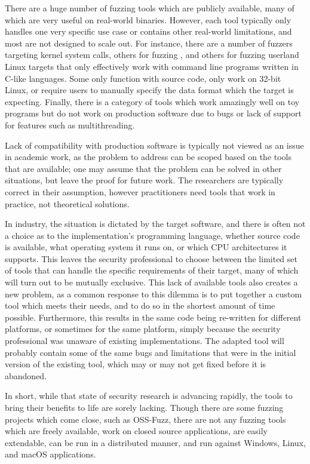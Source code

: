 There are a huge number of fuzzing tools\cite{afl,aflosx,winafl,peach22,syzkaller,ossfuzz,driller,radamsa,ni,zzuf,synfuzz,brundlefuzz,honggfuzz,kafl,vuzzer,boofuzz} which are publicly available, many of
which are very useful on real-world binaries.
However, each tool
typically only handles one very specific use case or contains other real-world limitations, and most are not designed to scale
out.  For instance, there are a number of fuzzers targeting kernel system calls\cite{syzkaller,trinity,kafl,osxfuzz}, others for
fuzzing \IOCTLs{}\cite{ioctlfuzzer,ioctlbf}, and others for fuzzing userland Linux targets that only effectively work with
command line programs written in C-like languages\cite{afl}.  Some only function with
source code, only work on 32-bit Linux\cite{vuzzer}, or require users to manually specify
the data format which the target is
expecting.\cite{peach,boofuzz}  Finally, there is a category of tools which work amazingly well
on toy programs but do not work on production software due to bugs or lack of
support for features such as multithreading.\cite{grimmdriller,angrissues}

Lack of compatibility with production software is typically not viewed as an issue in academic work, as the problem to address can be
scoped based on the tools that are available; one may assume that the problem can
be solved in other situations, but leave the proof for future work.  The researchers
are typically correct in their assumption, however practitioners need tools
that work in practice, not theoretical solutions.

In industry, the situation is dictated by the target software,
and there is often not a choice as to the implementation's programming language,
whether source code is available, what operating system it runs
on, or which CPU architectures it supports. This leaves the security
professional to choose between the limited set of tools that can handle the specific requirements of their target, many of which will
turn out to be mutually exclusive. This lack of available tools also creates a new problem, as a common
response to this dilemma is to put together a custom tool which meets their
needs, and to do so in the shortest amount of time possible.  Furthermore,
this results in the same code being re-written for different platforms, or
sometimes for the same platform, simply because the security professional was
unaware of existing implementations.  The adapted tool will probably
contain some of the same bugs and limitations that were in the initial
version of the existing tool, which may or may not get fixed before it is
abandoned.

In short, while that state of security research is advancing rapidly, the
tools to bring their benefits to life are sorely lacking.  Though there are some
fuzzing projects which come close, such as OSS-Fuzz,\cite{ossfuzz} there
are not any fuzzing tools which are freely available, work on closed source applications,
are easily extendable,
can be run in a distributed manner, and run against Windows, Linux, and macOS applications.
